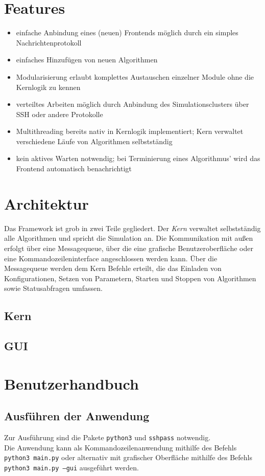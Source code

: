 \documentclass[
  a4paper,               %
  twoside,               %
  DIV=12,                %
  BCOR=8mm,              %
  headinclude=true,      %
  footinclude=false,     %
  numbers=noenddot,      %
  headheight=40pt,       %
  11pt]{scrartcl}        %
\begin{document}
\section{Features}
\begin{itemize}
\item einfache Anbindung eines (neuen) Frontends möglich durch ein simples Nachrichtenprotokoll
\item einfaches Hinzufügen von neuen Algorithmen
\item Modularisierung erlaubt komplettes Austauschen einzelner Module ohne die Kernlogik zu kennen
\item verteiltes Arbeiten möglich durch Anbindung des Simulationsclusters über SSH oder andere Protokolle
\item Multithreading bereits nativ in Kernlogik implementiert; Kern verwaltet verschiedene Läufe von Algorithmen selbstständig
\item kein aktives Warten notwendig; bei Terminierung eines Algorithmus' wird das Frontend automatisch benachrichtigt

\end{itemize}


\section{Architektur}
Das Framework ist grob in zwei Teile gegliedert. Der \emph{Kern} verwaltet selbstständig alle Algorithmen und spricht die Simulation an. Die Kommunikation mit außen erfolgt über eine Messagequeue, über die eine grafische Benutzeroberfläche oder eine Kommandozeileninterface angeschlossen werden kann. Über die Messagequeue werden dem Kern Befehle erteilt, die das Einladen von Konfigurationen, Setzen von Parametern, Starten und Stoppen von Algorithmen sowie Statusabfragen umfassen.
\subsection{Kern}

\subsection{GUI}

\section{Benutzerhandbuch}
\subsection{Ausführen der Anwendung}
Zur Ausführung sind die Pakete \texttt{python3} und \texttt{sshpass} notwendig.\\
Die Anwendung kann als Kommandozeilenanwendung mithilfe des Befehls \texttt{python3 main.py} oder alternativ mit grafischer Oberfläche mithilfe des Befehls \texttt{python3 main.py --gui} ausgeführt werden.
\end{document}
